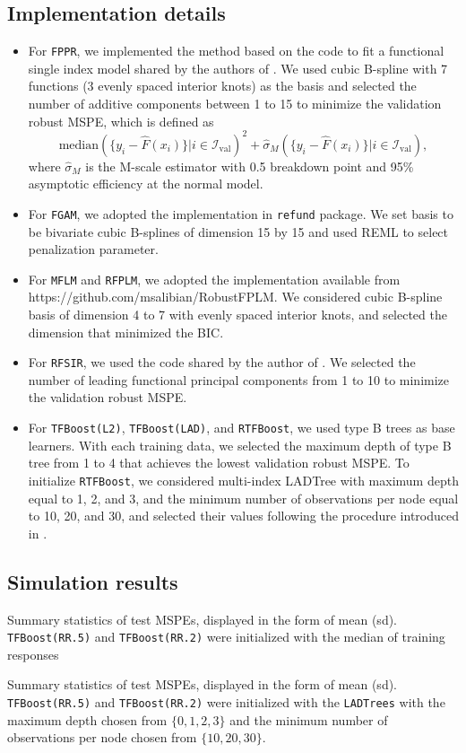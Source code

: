 \documentclass{article}
\begin{document}
\subsection{Implementation details}

\begin{itemize}
	\item For \texttt{FPPR}, we implemented the method based on the code to fit a functional single index model shared by  the authors of \cite{ferraty2013functional}.  We used cubic B-spline with 7 functions (3 evenly spaced interior knots) as the basis and selected the number of additive components between 1 to 15 to minimize the validation  robust  MSPE, which is defined as
	$$\text{median}( \{y_i - \hat{F}(x_i)\}|i \in \mathcal{I}_{\text{val}})^2 + \hat{\sigma}_M(  \{y_i - \hat{F}(x_i)\}|i \in \mathcal{I}_{\text{val}}),$$
	where $\hat{\sigma}_M$ is the M-scale estimator with 0.5 breakdown point and 95\% asymptotic efficiency at the normal model. 
	\item For \texttt{FGAM},  we adopted the implementation in \texttt{refund} package. We set basis to be bivariate cubic B-splines of dimension 15 by 15 and used REML to select penalization parameter. 
	\item For \texttt{MFLM} and \texttt{RFPLM}, we adopted the implementation available from \\ https://github.com/msalibian/RobustFPLM. We considered cubic B-spline basis of dimension 4 to 7 with evenly spaced interior knots, and selected the dimension that minimized the BIC. 
	\item For \texttt{RFSIR}, we used the code shared by the author of \cite{wang2017robust}. We selected the number of leading functional principal components from 1 to 10 to minimize the validation  robust  MSPE. 
	\item For \texttt{TFBoost(L2)},  \texttt{TFBoost(LAD)}, and  \texttt{RTFBoost}, we used type B trees as base learners. With each training data, we selected the maximum depth of type B tree from 1 to 4 that achieves the lowest validation robust MSPE. To initialize \texttt{RTFBoost}, we considered multi-index LADTree with  maximum depth equal to 1, 2, and 3, and the minimum number of observations per node equal to 10, 20, and 30, and selected their values following the procedure introduced in . 
\end{itemize}



\subsection{Simulation results}
Summary statistics of test MSPEs, displayed in the form of mean (sd). 
\texttt{TFBoost(RR.5)} and \texttt{TFBoost(RR.2)} were initialized with the median of training responses


Summary statistics of test MSPEs, displayed in the form of mean (sd). 
\texttt{TFBoost(RR.5)} and \texttt{TFBoost(RR.2)} were initialized with the \texttt{LADTrees} with the maximum depth chosen from $\{0,1,2,3\}$ and the minimum number of observations per node chosen from 
$\{10,20,30\}$. 



\end{document}

